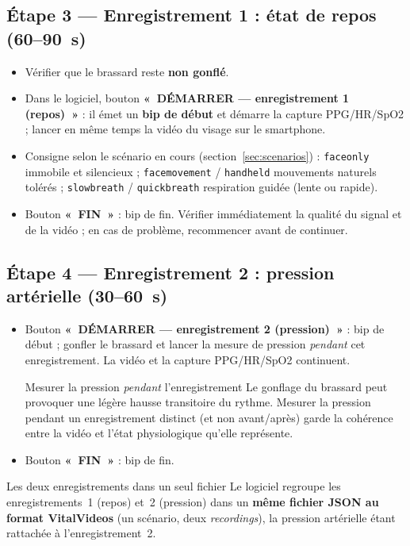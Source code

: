 \documentclass[11pt,a4paper]{article}
\begin{document}
\subsection{Étape 3 --- Enregistrement 1 : état de repos (60--90~s)}
\begin{itemize}
\item Vérifier que le brassard reste \textbf{non gonflé}.
\item Dans le logiciel, bouton \textbf{«~DÉMARRER --- enregistrement 1 (repos)~»} :
il émet un \textbf{bip de début} et démarre la capture PPG/HR/SpO2 ; lancer en
même temps la vidéo du visage sur le smartphone.
\item Consigne selon le scénario en cours (section~\ref{sec:scenarios}) :
\texttt{faceonly} immobile et silencieux ; \texttt{facemovement} /
\texttt{handheld} mouvements naturels tolérés ; \texttt{slowbreath} /
\texttt{quickbreath} respiration guidée (lente ou rapide).
\item Bouton \textbf{«~FIN~»} : bip de fin. Vérifier immédiatement la qualité du
signal et de la vidéo ; en cas de problème, recommencer avant de continuer.
\end{itemize}

\subsection{Étape 4 --- Enregistrement 2 : pression artérielle (30--60~s)}
\begin{itemize}
\item Bouton \textbf{«~DÉMARRER --- enregistrement 2 (pression)~»} : bip de début ;
gonfler le brassard et lancer la mesure de pression \emph{pendant} cet
enregistrement. La vidéo et la capture PPG/HR/SpO2 continuent.
\begin{warnbox}{Mesurer la pression \emph{pendant} l'enregistrement}
Le gonflage du brassard peut provoquer une légère hausse transitoire du rythme.
Mesurer la pression pendant un enregistrement distinct (et non avant/après) garde
la cohérence entre la vidéo et l'état physiologique qu'elle représente.
\end{warnbox}
\item Bouton \textbf{«~FIN~»} : bip de fin.
\end{itemize}

\begin{notebox}{Les deux enregistrements dans un seul fichier}
Le logiciel regroupe les enregistrements~1 (repos) et~2 (pression) dans un
\textbf{même fichier JSON au format VitalVideos} (un scénario, deux
\emph{recordings}), la pression artérielle étant rattachée à l'enregistrement~2.
\end{notebox}
\end{document}
